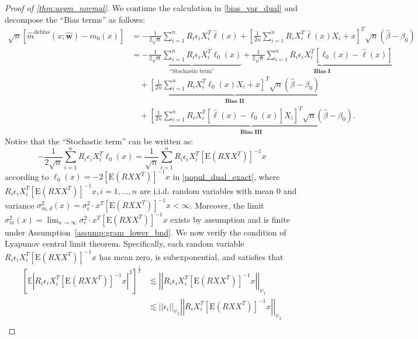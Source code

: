 \documentclass[ejsv2,noshowframe]{imsart}
\theoremstyle{plain}
\theoremstyle{definition}
\theoremstyle{remark}
\newcommand{\norm}[1]{\left|\left| #1 \right|\right|}
\renewcommand{\hat}{\widehat}
\begin{document}
\begin{proof}[Proof of \autoref{thm:asym_normal}]
	We continue the calculation in \eqref{bias_var_dual} and decompose the ``Bias terms'' as follows:
	\begin{align*}
		\sqrt{n}\left[\hat{m}^{\text{debias}}(x;\hat{\bm{w}}) - m_0(x)\right]
		&= -\frac{1}{2\sqrt{n}} \sum_{i=1}^n R_i\epsilon_i X_i^T\hat{\ell}(x) + \left[\frac{1}{2n} \sum_{i=1}^n R_i X_i^T\hat{\ell}(x) X_i +x \right]^T \sqrt{n}\left(\hat{\beta} -\beta_0 \right)\\
		&= \underbrace{-\frac{1}{2\sqrt{n}} \sum_{i=1}^n R_i\epsilon_i X_i^T\ell_0(x)}_{\text{``Stochastic term''}} + \underbrace{\frac{1}{2\sqrt{n}} \sum_{i=1}^n R_i\epsilon_i X_i^T\left[\ell_0(x) - \hat{\ell}(x)\right]}_{\textbf{Bias I}} \\
		&\quad + \underbrace{\left[\frac{1}{2n} \sum_{i=1}^n R_i X_i^T\ell_0(x) X_i +x \right]^T \sqrt{n}\left(\hat{\beta} -\beta_0 \right)}_{\textbf{Bias II}}\\
		&\quad + \underbrace{\left[\frac{1}{2n} \sum_{i=1}^n R_i X_i^T\left[\hat{\ell}(x) - \ell_0(x)\right] X_i \right]^T \sqrt{n}\left(\hat{\beta} -\beta_0 \right)}_{\textbf{Bias III}}.
	\end{align*}
	Notice that the ``Stochastic term'' can be written as:
	$$-\frac{1}{2\sqrt{n}} \sum_{i=1}^n R_i\epsilon_i X_i^T\ell_0(x) = \frac{1}{\sqrt{n}}\sum_{i=1}^n R_i\epsilon_i X_i^T \left[\mathrm{E}\left(R XX^T\right)\right]^{-1} x$$
	according to $\ell_0(x) = -2\left[\mathrm{E}\left(R XX^T\right)\right]^{-1} x$ in \eqref{popul_dual_exact}, where $R_i\epsilon_i X_i^T\left[\mathrm{E}\left(R XX^T\right)\right]^{-1} x,i=1,...,n$ are i.i.d. random variables with mean 0 and variance $\sigma_{m,d}^2(x) = \sigma_{\epsilon}^2\cdot x^T\left[\mathrm{E}(R XX^T)\right]^{-1}x < \infty$. Moreover, the limit $\sigma_m^2(x) = \lim_{n\to\infty}\sigma_{\epsilon}^2\cdot x^T\left[\mathrm{E}(R XX^T)\right]^{-1}x$ exists by assumption and is finite under Assumption~\ref{assump:gram_lower_bnd}. We now verify the condition of Lyapunov central limit theorem. Specifically, each random variable $R_i\epsilon_i X_i^T \left[\mathrm{E}\left(R XX^T\right)\right]^{-1} x$ has mean zero, is subexponential, and satisfies that
	\begin{align*}
		\left[\mathbb{E}\left|R_i\epsilon_i X_i^T \left[\mathrm{E}\left(R XX^T\right)\right]^{-1} x\right|^3 \right]^{\frac{1}{3}} &\lesssim \norm{R_i\epsilon_i X_i^T \left[\mathrm{E}\left(R XX^T\right)\right]^{-1} x}_{\psi_1} \\
		&\lesssim \norm{\epsilon_i}_{\psi_2} \norm{R_i X_i^T \left[\mathrm{E}\left(R XX^T\right)\right]^{-1} x}_{\psi_2}\\

\end{align*}
\end{proof}
\end{document}
